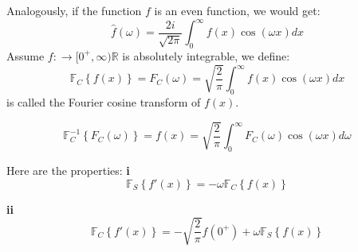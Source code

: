 \documentclass[12pt]{article} %
\begin{document}
 Analogously, if the function $f$ is an even function, we would get:
 $$
 \hat{f}(\omega) = \frac{ 2i}{\sqrt{2 \pi}}\int_{0}^{\infty} f(x) \cos(\omega x) dx 
 $$
 Assume $f: \to [0^{+}, \infty) \mathbb{R} $ is absolutely integrable, we define:
 $$
\mathbb{F}_{C}\left\{ f(x) \right\} = F_{C}(\omega) = \sqrt{\frac{2}{\pi}} \int_{0}^{\infty} f(x) \cos (\omega x) dx
$$is called the Fourier cosine transform of $f (x)$.\par
$$
\mathbb{F}_{C}^{-1}\left\{ F_{C}(\omega) \right\} =f(x) =  \sqrt{\frac{2}{\pi}} \int_{0}^{\infty} F_{C}(\omega) \cos(\omega x) d \omega
$$\par
Here are the properties:
\textbf{i} 
$$
\mathbb{F}_{S} \left\{ f'(x) \right\} = -\omega \mathbb{F}_{C} \left\{ f(x) \right\}
$$\par
\textbf{ii}
$$
\mathbb{F}_{C} \left\{ f'(x) \right\} = -\sqrt{\frac{2}{\pi}} f(0^{+}) + \omega \mathbb{F}_{S} \left\{ f(x) \right\}
$$ 
\end{document}
